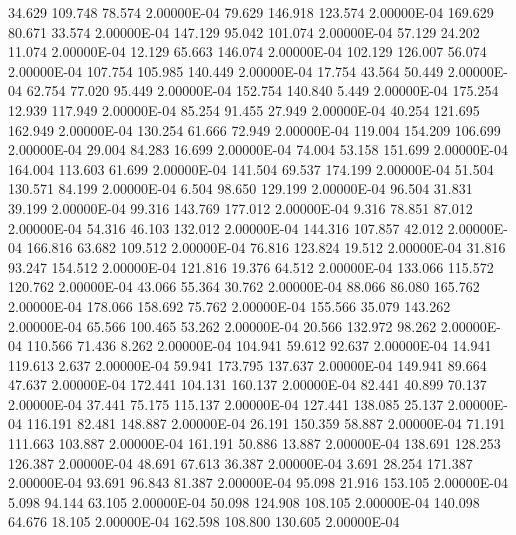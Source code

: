     34.629   109.748    78.574  2.00000E-04
    79.629   146.918   123.574  2.00000E-04
   169.629    80.671    33.574  2.00000E-04
   147.129    95.042   101.074  2.00000E-04
    57.129    24.202    11.074  2.00000E-04
    12.129    65.663   146.074  2.00000E-04
   102.129   126.007    56.074  2.00000E-04
   107.754   105.985   140.449  2.00000E-04
    17.754    43.564    50.449  2.00000E-04
    62.754    77.020    95.449  2.00000E-04
   152.754   140.840     5.449  2.00000E-04
   175.254    12.939   117.949  2.00000E-04
    85.254    91.455    27.949  2.00000E-04
    40.254   121.695   162.949  2.00000E-04
   130.254    61.666    72.949  2.00000E-04
   119.004   154.209   106.699  2.00000E-04
    29.004    84.283    16.699  2.00000E-04
    74.004    53.158   151.699  2.00000E-04
   164.004   113.603    61.699  2.00000E-04
   141.504    69.537   174.199  2.00000E-04
    51.504   130.571    84.199  2.00000E-04
     6.504    98.650   129.199  2.00000E-04
    96.504    31.831    39.199  2.00000E-04
    99.316   143.769   177.012  2.00000E-04
     9.316    78.851    87.012  2.00000E-04
    54.316    46.103   132.012  2.00000E-04
   144.316   107.857    42.012  2.00000E-04
   166.816    63.682   109.512  2.00000E-04
    76.816   123.824    19.512  2.00000E-04
    31.816    93.247   154.512  2.00000E-04
   121.816    19.376    64.512  2.00000E-04
   133.066   115.572   120.762  2.00000E-04
    43.066    55.364    30.762  2.00000E-04
    88.066    86.080   165.762  2.00000E-04
   178.066   158.692    75.762  2.00000E-04
   155.566    35.079   143.262  2.00000E-04
    65.566   100.465    53.262  2.00000E-04
    20.566   132.972    98.262  2.00000E-04
   110.566    71.436     8.262  2.00000E-04
   104.941    59.612    92.637  2.00000E-04
    14.941   119.613     2.637  2.00000E-04
    59.941   173.795   137.637  2.00000E-04
   149.941    89.664    47.637  2.00000E-04
   172.441   104.131   160.137  2.00000E-04
    82.441    40.899    70.137  2.00000E-04
    37.441    75.175   115.137  2.00000E-04
   127.441   138.085    25.137  2.00000E-04
   116.191    82.481   148.887  2.00000E-04
    26.191   150.359    58.887  2.00000E-04
    71.191   111.663   103.887  2.00000E-04
   161.191    50.886    13.887  2.00000E-04
   138.691   128.253   126.387  2.00000E-04
    48.691    67.613    36.387  2.00000E-04
     3.691    28.254   171.387  2.00000E-04
    93.691    96.843    81.387  2.00000E-04
    95.098    21.916   153.105  2.00000E-04
     5.098    94.144    63.105  2.00000E-04
    50.098   124.908   108.105  2.00000E-04
   140.098    64.676    18.105  2.00000E-04
   162.598   108.800   130.605  2.00000E-04
